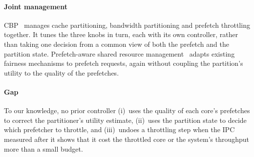 \paragraph{Joint management}
CBP~\cite{holtryd2021cbp} manages cache partitioning, bandwidth partitioning and prefetch throttling together.  It
tunes the three knobs in turn, each with its own controller, rather than taking one decision from a common view of
both the prefetch and the partition state.  Prefetch-aware shared resource management~\cite{ebrahimi2011prefetchaware}
adapts existing fairness mechanisms to prefetch requests, again without coupling the partition's utility to the
quality of the prefetches.

\paragraph{Gap}
To our knowledge, no prior controller (i)~uses the quality of each core's prefetches to correct the partitioner's
utility estimate, (ii)~uses the partition state to decide which prefetcher to throttle, and (iii)~undoes a throttling step when the IPC measured after it shows that it cost the throttled core or the
system's throughput more than a small budget.
